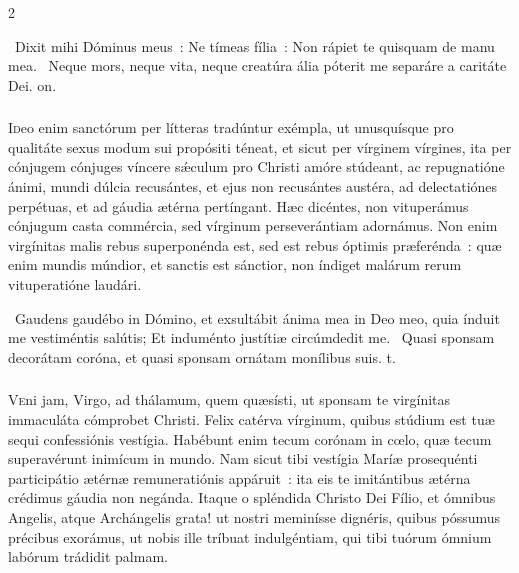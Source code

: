 \documentclass[9pt,twoside]{extarticle}
\begin{document}
\begin{multicols}{2}
{\begin{tightlist}{}
\item {}~Dixit mihi Dóminus meus~: Ne tímeas fília~: \textred{*} Non rápiet te quisquam de manu mea. ~Neque mors, neque vita, neque creatúra ália póterit me separáre a caritáte Dei. on.
\end{tightlist}

\subsubsection*{\center {}}
\lettrine{I}deo enim sanctórum per lítteras tradúntur exémpla, ut unusquísque pro qualitáte sexus modum sui propósiti téneat, et sicut per vírginem vírgines, ita per cónjugem cónjuges víncere sǽculum pro Christi amóre stúdeant, ac repugnatióne ánimi, mundi dúlcia recusántes, et ejus non recusántes austéra, ad delectatiónes perpétuas, et ad gáudia ætérna pertíngant. Hæc dicéntes, non vituperámus cónjugum casta commércia, sed vírginum perseverántiam adornámus. Non enim virgínitas malis rebus superponénda est, sed est rebus óptimis præferénda~: quæ enim mundis múndior, et sanctis est sánctior, non índiget malárum rerum vituperatióne laudári.

\begin{tightlist}{}
\item {}~Gaudens gaudébo in Dómino, et exsultábit ánima mea in Deo meo, quia índuit me vestiméntis salútis; \textred{*} Et induménto justítiæ circúmdedit me. ~Quasi sponsam decorátam coróna, et quasi sponsam ornátam monílibus suis. t.
\end{tightlist}

\subsubsection*{\center {}}
\lettrine{V}eni jam, Virgo, ad thálamum, quem quæsísti, ut sponsam te virgínitas immaculáta cómprobet Christi. Felix catérva vírginum, quibus stúdium est tuæ sequi confessiónis vestígia. Habébunt enim tecum corónam in cœlo, quæ tecum superavérunt inimícum in mundo. Nam sicut tibi vestígia Maríæ prosequénti participátio ætérnæ remuneratiónis appáruit~: ita eis te imitántibus ætérna crédimus gáudia non negánda. Itaque o spléndida Christo Dei Fílio, et ómnibus Angelis, atque Archángelis grata! ut nostri meminísse dignéris, quibus póssumus précibus exorámus, ut nobis ille tríbuat indulgéntiam, qui tibi tuórum ómnium labórum trádidit palmam. 

}
\end{multicols}
\end{document}
